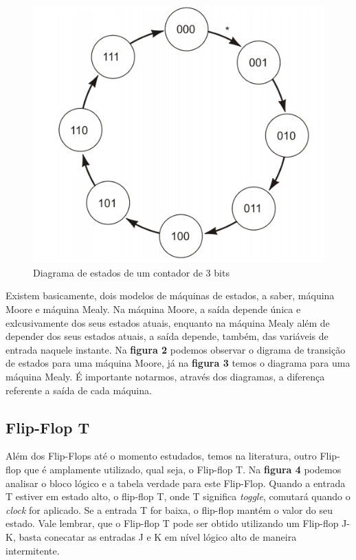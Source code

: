 \documentclass[12pt]{article}
\begin{document}
\begin{figure}[!htbp]
\centering
\includegraphics[width=.5\textwidth]{img/diagrama-estados.png}
\caption{Diagrama de estados de um contador de 3 bits\cite{floyd2011digital}}
\label{fig:diagrama-estados}
\end{figure}

Existem basicamente, dois modelos de máquinas de estados, a saber, máquina Moore e máquina Mealy. Na máquina Moore, a saída depende única e exlcusivamente dos seus estados atuais, enquanto na máquina Mealy além de depender dos seus estados atuais, a saída depende, também, das variáveis de entrada naquele instante. Na \textbf{figura 2} podemos observar  o digrama de transição de estados para uma máquina Moore, já na \textbf{figura 3} temos o diagrama para uma máquina Mealy. É importante notarmos, através dos diagramas, a diferença referente a saída de cada máquina.   


\subsection{Flip-Flop T}

Além dos Flip-Flops até o momento estudados, temos na literatura, outro Flip-flop que é amplamente utilizado, qual seja, o Flip-flop T. Na \textbf{figura 4} podemos analisar o bloco lógico e a tabela verdade para este Flip-Flop. Quando a entrada T estiver em estado alto, o flip-flop T, onde T significa \textit{toggle}, comutará quando o \textit{clock} for aplicado. Se a entrada T for baixa, o flip-flop mantém o valor do seu estado. Vale lembrar, que o Flip-flop T pode ser obtido utilizando um Flip-flop J-K, basta conecatar as entradas J e K em nível lógico alto de maneira intermitente.  
\end{document}
